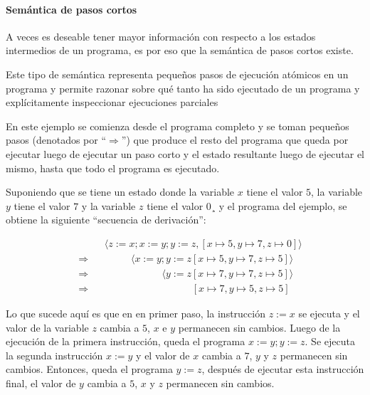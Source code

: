 \paragraph{Semántica de pasos cortos}

A veces es deseable tener mayor información con respecto a los estados intermedios de un programa, es por eso que la semántica de pasos cortos existe.

Este tipo de semántica representa pequeños pasos de ejecución atómicos en un programa y permite razonar sobre qué tanto ha sido ejecutado de un programa y explícitamente inspeccionar ejecuciones parciales~\citep{nipkow}

En este ejemplo se comienza desde el programa completo y se toman pequeños pasos (denotados por ``$\Rightarrow$'') que produce el resto del programa que queda por ejecutar luego de ejecutar un paso corto y el estado resultante luego de ejecutar el mismo, hasta que todo el programa es ejecutado.

Suponiendo que se tiene un estado donde la variable $x$ tiene el valor $5$, la variable $y$ tiene el valor $7$ y la variable $z$ tiene el valor $0$¸ y el programa del ejemplo, se obtiene la siguiente ``secuencia de derivación'':

\begin{equation*}
\begin{split}
& \phantom{\Rightarrow} \phantom{=} \langle z:=x; x:=y; y:=z, [x\mapsto5, y\mapsto7, z\mapsto0]\rangle\\
& \Rightarrow \phantom{=} \phantom{z:=x} \langle x:=y; y:=z [x\mapsto5, y\mapsto7, z\mapsto5]\rangle\\
& \Rightarrow \phantom{=} \phantom{z:=x; x:=y} \langle y:=z [x\mapsto7, y\mapsto7, z\mapsto5]\rangle\\
& \Rightarrow \phantom{=} \phantom{z:=x; x:=y; y:=z} [x\mapsto7, y\mapsto5, z\mapsto5]
\end{split}
\end{equation*}

Lo que sucede aquí es que en en primer paso, la instrucción $z:=x$ se ejecuta y el valor de la variable $z$ cambia a $5$, $x$ e $y$ permanecen sin cambios.
Luego de la ejecución de la primera instrucción, queda el programa $x:=y; y:=z$.
Se ejecuta la segunda instrucción $x:=y$ y el valor de $x$ cambia a $7$, $y$ y $z$ permanecen sin cambios.
Entonces, queda el programa $y:=z$, después de ejecutar esta instrucción final, el valor de $y$ cambia a $5$, $x$ y $z$ permanecen sin cambios.

